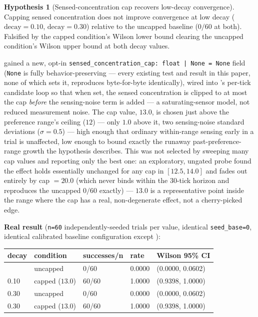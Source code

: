 \documentclass[
  english,
]{article}
\newcounter{none} %
\theoremstyle{definition}
\newtheorem{hypothesis}[theorem]{Hypothesis}
\begin{document}
\begin{hypothesis}[Sensed-concentration cap recovers low-decay convergence]
Capping sensed concentration does not improve convergence at low decay (\(\text{decay}=0.10\),
\(\text{decay}=0.30\)) relative to the uncapped baseline (\(0/60\) at both). Falsified by the capped
condition's Wilson lower bound clearing the uncapped condition's Wilson upper bound at both decay
values.
\end{hypothesis}

 gained a new, opt-in
\texttt{sensed\_concentration\_cap:\ float\ |{}\ None\ =\ None}
field (\texttt{None} is fully behavior-preserving --- every existing
test and result in this paper, none of which sets it, reproduces
byte-for-byte identically), wired into 's
per-tick candidate loop so that when set, the sensed concentration
 is clipped to at most the cap
\emph{before} the sensing-noise term is added --- a saturating-sensor
model, not reduced measurement noise. The cap value, \(13.0\), is chosen
just above the preference range's ceiling (\(12\)) --- only \(1.0\)
above it, two sensing-noise standard deviations (\(\sigma=0.5\)) ---
high enough that ordinary within-range sensing early in a trial is
unaffected, low enough to bound exactly the runaway
past-preference-range growth the hypothesis describes. This was not
selected by sweeping many cap values and reporting only the best one: an
exploratory, ungated probe found the effect holds essentially unchanged
for any cap in \([12.5, 14.0]\) and fades out entirely by cap \(=20.0\)
(which never binds within the 30-tick horizon and reproduces the
uncapped \(0/60\) exactly) --- \(13.0\) is a representative point inside
the range where the cap has a real, non-degenerate effect, not a
cherry-picked edge.

\textbf{Real result} (\texttt{n=60} independently-seeded trials per
value, identical \texttt{seed\_base=0}, identical calibrated baseline
configuration except ):

{\def\LTcaptype{none} %
\begin{longtable}[]{@{}lllll@{}}
\toprule\noalign{}
decay & condition & successes/n & rate & Wilson 95\% CI \\
\midrule\noalign{}
\endhead
\bottomrule\noalign{}
\endlastfoot
0.10 & uncapped & 0/60 & 0.0000 & (0.0000, 0.0602) \\
0.10 & capped (\(13.0\)) & 60/60 & 1.0000 & (0.9398, 1.0000) \\
0.30 & uncapped & 0/60 & 0.0000 & (0.0000, 0.0602) \\
0.30 & capped (\(13.0\)) & 60/60 & 1.0000 & (0.9398, 1.0000) \\
\end{longtable}
}
\end{document}
